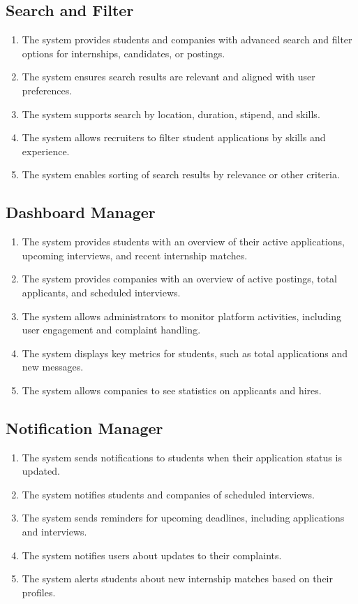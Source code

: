 \subsection{Search and Filter}
\label{subsec:search_and_filter}
\begin{enumerate}[label=R\arabic*:, itemsep=0.2em, start=40]
    \item The system provides students and companies with advanced search and filter options for internships, candidates, or postings.
    \item The system ensures search results are relevant and aligned with user preferences.
    \item The system supports search by location, duration, stipend, and skills.
    \item The system allows recruiters to filter student applications by skills and experience.
    \item The system enables sorting of search results by relevance or other criteria.
\end{enumerate}

\subsection{Dashboard Manager}
\label{subsec:dashboard_manager}
\begin{enumerate}[label=R\arabic*:, itemsep=0.2em, start=45]
    \item The system provides students with an overview of their active applications, upcoming interviews, and recent internship matches.
    \item The system provides companies with an overview of active postings, total applicants, and scheduled interviews.
    \item The system allows administrators to monitor platform activities, including user engagement and complaint handling.
    \item The system displays key metrics for students, such as total applications and new messages.
    \item The system allows companies to see statistics on applicants and hires.
\end{enumerate}

\subsection{Notification Manager}
\label{subsec:notification_manager}
\begin{enumerate}[label=R\arabic*:, itemsep=0.2em, start=50]
    \item The system sends notifications to students when their application status is updated.
    \item The system notifies students and companies of scheduled interviews.
    \item The system sends reminders for upcoming deadlines, including applications and interviews.
    \item The system notifies users about updates to their complaints.
    \item The system alerts students about new internship matches based on their profiles.
\end{enumerate}

